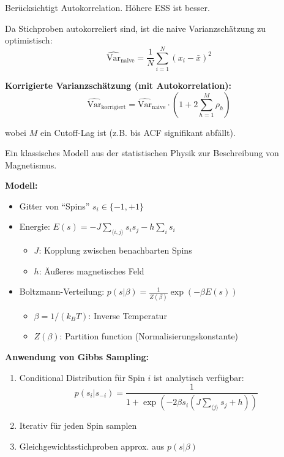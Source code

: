 Berücksichtigt Autokorrelation. Höhere ESS ist besser.

Da Stichproben autokorreliert sind, ist die naive Varianzschätzung zu optimistisch:
$$\widehat{\text{Var}}_{\text{naive}} = \frac{1}{N} \sum_{i=1}^{N} (x_i - \bar{x})^2$$

\textbf{Korrigierte Varianzschätzung (mit Autokorrelation):}
$$\widehat{\text{Var}}_{\text{korrigiert}} = \widehat{\text{Var}}_{\text{naive}} \cdot \left(1 + 2 \sum_{h=1}^{M} \rho_h \right)$$

wobei $M$ ein Cutoff-Lag ist (z.B. bis ACF signifikant abfällt).

Ein klassisches Modell aus der statistischen Physik zur Beschreibung von Magnetismus.

\textbf{Modell:}
\begin{itemize}[leftmargin=1.5em]
    \item Gitter von ``Spins'' $s_i \in \{-1, +1\}$
    \item Energie: $E(s) = -J \sum_{\langle i,j \rangle} s_i s_j - h \sum_i s_i$
    \begin{itemize}[leftmargin=1.5em]
        \item $J$: Kopplung zwischen benachbarten Spins
        \item $h$: Äußeres magnetisches Feld
    \end{itemize}
    \item Boltzmann-Verteilung: $p(s | \beta) = \frac{1}{Z(\beta)} \exp(-\beta E(s))$
    \begin{itemize}[leftmargin=1.5em]
        \item $\beta = 1/(k_B T)$: Inverse Temperatur
        \item $Z(\beta)$: Partition function (Normalisierungskonstante)
    \end{itemize}
\end{itemize}

\textbf{Anwendung von Gibbs Sampling:}
\begin{enumerate}[leftmargin=1.5em]
    \item Conditional Distribution für Spin $i$ ist analytisch verfügbar:
    $$p(s_i | s_{-i}) = \frac{1}{1 + \exp(-2\beta s_i (J \sum_{\langle j \rangle} s_j + h))}$$
    \item Iterativ für jeden Spin samplen
    \item Gleichgewichtsstichproben approx. aus $p(s | \beta)$
\end{enumerate}


